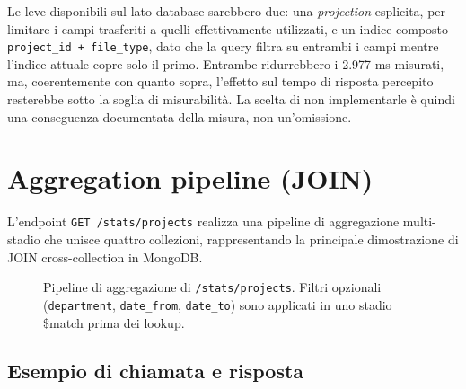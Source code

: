 \documentclass[11pt,a4paper]{article}
\begin{document}
Le leve disponibili sul lato database sarebbero due: una \emph{projection} esplicita, per limitare i campi trasferiti a quelli effettivamente utilizzati, e un indice composto \texttt{project\_id + file\_type}, dato che la query filtra su entrambi i campi mentre l'indice attuale copre solo il primo. Entrambe ridurrebbero i 2.977 ms misurati, ma, coerentemente con quanto sopra, l'effetto sul tempo di risposta percepito resterebbe sotto la soglia di misurabilità. La scelta di non implementarle è quindi una conseguenza documentata della misura, non un'omissione.

\pagebreak

\section{Aggregation pipeline (JOIN)}

L'endpoint \texttt{GET /stats/projects} realizza una pipeline di aggregazione multi-stadio che unisce quattro collezioni, rappresentando la principale dimostrazione di JOIN cross-collection in MongoDB.

\begin{figure}[h!]
\centering
{}
\caption{Pipeline di aggregazione di \texttt{/stats/projects}. Filtri opzionali (\texttt{department}, \texttt{date\_from}, \texttt{date\_to}) sono applicati in uno stadio \$match prima dei lookup.}
\end{figure}

\subsection{Esempio di chiamata e risposta}
\end{document}
